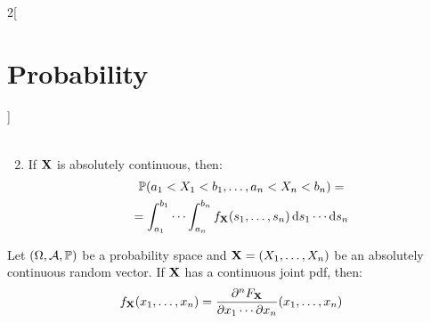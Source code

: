\documentclass[../../../main.tex]{subfiles}
\begin{document}
\begin{multicols}{2}[\section{Probability}]
\begin{proposition}
\begin{enumerate}
\begin{multline*}
            \end{multline*}
      \item If $\boldsymbol{\mathrm{X}}$ is absolutely continuous, then:
            \begin{multline*}
              \mathbb{P}(a_1<X_1<b_1,\ldots,a_n<X_n<b_n)=\\=\int_{a_1}^{b_1}\cdots\int_{a_n}^{b_n} f_{\boldsymbol{\mathrm{X}}}(s_1,\ldots,s_n)\dd{s}_1\cdots\dd{s}_n
            \end{multline*}
    \end{enumerate}
  \end{proposition}
  \begin{proposition}
    Let $(\Omega,\mathcal{A},\mathbb{P})$ be a probability space and $\boldsymbol{\mathrm{X}}=(X_1,\ldots,X_n)$ be an absolutely continuous random vector. If $\boldsymbol{\mathrm{X}}$ has a continuous joint pdf, then: $$f_{\boldsymbol{\mathrm{X}}}(x_1,\ldots,x_n)=\frac{\partial^nF_{\boldsymbol{\mathrm{X}}}}{\partial x_1\cdots\partial x_n}(x_1,\ldots,x_n)$$
  \end{proposition}

\end{multicols}
\end{document}
